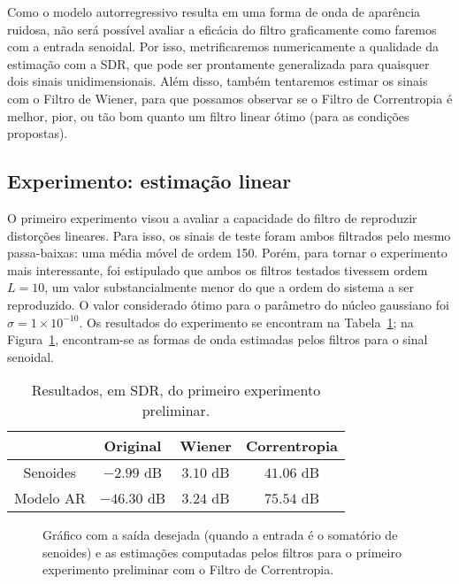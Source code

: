 Como o modelo autorregressivo resulta em uma forma de onda de aparência ruidosa, não será possível avaliar a eficácia do filtro graficamente como faremos com a entrada senoidal. Por isso, metrificaremos numericamente a qualidade da estimação com a SDR, que pode ser prontamente generalizada para quaisquer dois sinais unidimensionais. Além disso, também tentaremos estimar os sinais com o Filtro de Wiener, para que possamos observar se o Filtro de Correntropia é melhor, pior, ou tão bom quanto um filtro linear ótimo (para as condições propostas).

\subsection{Experimento: estimação linear}

O primeiro experimento visou a avaliar a capacidade do filtro de reproduzir distorções lineares. Para isso, os sinais de teste foram ambos filtrados pelo mesmo passa-baixas: uma média móvel de ordem 150. Porém, para tornar o experimento mais interessante, foi estipulado que ambos os filtros testados tivessem ordem $L = 10$, um valor substancialmente menor do que a ordem do sistema a ser reproduzido. O valor considerado ótimo para o parâmetro do núcleo gaussiano foi $\sigma = 1 \times 10^{-10}$. Os resultados do experimento se encontram na Tabela~\ref{tab:correntropy:poc-experiment-1}; na Figura~\ref{fig:correntropy:poc-experiment-1}, encontram-se as formas de onda estimadas pelos filtros para o sinal senoidal.
{\def\arraystretch{1.25}\tabcolsep=10pt
\begin{table}[!ht]
    \centering
    \caption[Resultados do primeiro experimento preliminar: estimação linear]{Resultados, em SDR, do primeiro experimento preliminar.}
    \label{tab:correntropy:poc-experiment-1}
    \begin{tabular}{cccc}
        \toprule
                    & Original & Wiener       & Correntropia  \\ \midrule
        Senoides    & $-2.99$ dB & $3.10$ dB    & $41.06$ dB    \\
        Modelo AR   & $-46.30$ dB & $3.24$ dB    & $75.54$ dB    \\ \bottomrule
    \end{tabular}
\end{table}
}
\begin{figure}[!ht]
    \centering
    
    \caption[Saída desejada e estimações do primeiro experimento preliminar]{Gráfico com a saída desejada (quando a entrada é o somatório de senoides) e as estimações computadas pelos filtros para o primeiro experimento preliminar com o Filtro de Correntropia.}
    \label{fig:correntropy:poc-experiment-1}
\end{figure}

